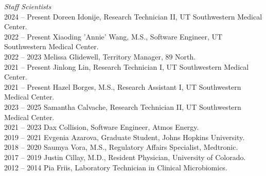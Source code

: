 \textit{Staff Scientists} \\
2024 -- Present \hspace{14pt} Doreen Idonije, Research Technician II, UT Southwestern Medical Center. \\
2022 -- Present \hspace{14pt} Xiaoding 'Annie' Wang, M.S., Software Engineer, UT Southwestern Medical Center. \\
2022 -- 2023 \hspace{28pt} Melissa Glidewell, Territory Manager, 89 North. \\
2021 -- Present \hspace{14pt} Jinlong Lin, Research Technician I, UT Southwestern Medical Center. \\
2021 -- Present \hspace{14pt} Hazel Borges, M.S., Research Assistant I, UT Southwestern Medical Center. \\
2023 -- 2025 \hspace{28pt} Samantha Calvache, Research Technician II, UT Southwestern Medical Center. \\
2021 -- 2023 \hspace{28pt} Dax Collision, Software Engineer, Atmos Energy. \\
2019 -- 2021 \hspace{28pt} Evgenia Azarova, Graduate Student, Johns Hopkins University. \\
2018 -- 2020 \hspace{28pt} Saumya Vora, M.S., Regulatory Affairs Specialist, Medtronic. \\
2017 -- 2019 \hspace{28pt} Justin Cillay, M.D., Resident Physician, University of Colorado. \\
2012 -- 2014 \hspace{28pt} Pia Friis,  Laboratory Technician in Clinical Microbiomics. \\


